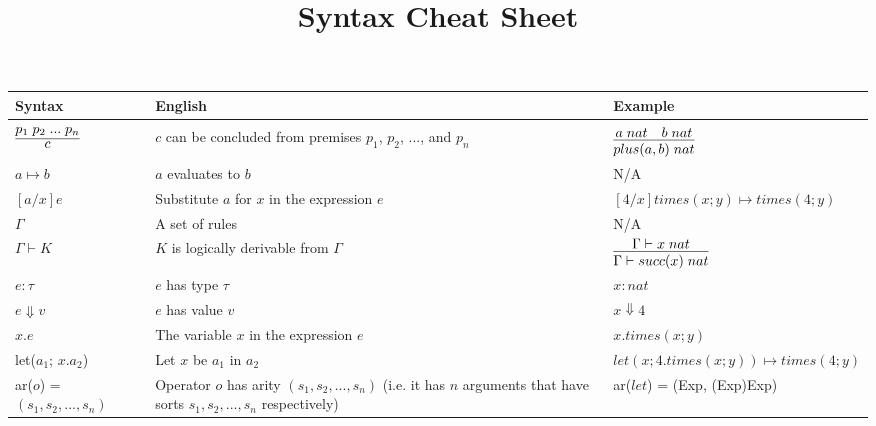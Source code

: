 \documentclass[12pt]{article}
\begin{document}
 
\title{Syntax Cheat Sheet}
 
\maketitle

\renewcommand{\arraystretch}{2.0}

\begin{tabular}{l | p{6cm} | p{6cm} }
	\bf{Syntax} & \bf{English} & \bf{Example} \\
	\hline & & \\

	$\infer{c}{p_1 \; p_2 \; ... \; p_n}$ & $c$ can be concluded from premises $p_1$, $p_2$, ..., and $p_n$ & $\infer{plus(a,b) \; nat}{a\; nat \quad b \; nat}$\\

	$a \mapsto b$ & $a$ evaluates to $b$ &  N/A\\

	$[a/x]e$ & Substitute $a$ for $x$ in the expression $e$ & $[4/x]times(x; y) \mapsto times(4; y)$\\

	$\Gamma$ & A set of rules & N/A \\

	$\Gamma \vdash K$ & $K$ is logically derivable from $\Gamma$ & $\infer{\Gamma \vdash succ(x) \; nat}{\Gamma \vdash x \; nat}$ \\
	$e : \tau$ & $e$ has type $\tau$ & $x : nat$ \\

	$e \Downarrow v$ & $e$ has value $v$ & $x \Downarrow 4$ \\

	$x.e$ & The variable $x$ in the expression $e$ & $x.times(x;y)$ \\

	let($a_1$; $x.a_2$) & Let $x$ be $a_1$ in $a_2$ & $let(x; 4 . times(x; y)) \mapsto times(4; y)$ \\

	ar($o$) = $(s_1, s_2, ..., s_n)$ & Operator $o$ has arity $(s_1, s_2, ..., s_n)$ (i.e. it has $n$ arguments that have sorts $s_1, s_2, ..., s_n$ respectively) & ar($let$) = (Exp, (Exp)Exp) \\


\end{tabular}
\end{document}
